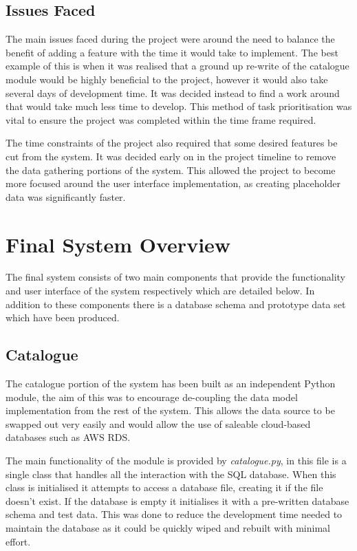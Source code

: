 \documentclass[12pt,titlepage]{article}
\begin{document}
  \subsection{Issues Faced}

  The main issues faced during the project were around the need to balance the
  benefit of adding a feature with the time it would take to implement. The best
  example of this is when it was realised that a ground up re-write of the
  catalogue module would be highly beneficial to the project, however it would
  also take several days of development time. It was decided instead to find a
  work around that would take much less time to develop. This method of task
  prioritisation was vital to ensure the project was completed within the
  time frame required.

  The time constraints of the project also required that some desired features
  be cut from the system. It was decided early on in the project timeline to
  remove the data gathering portions of the system. This allowed the project to
  become more focused around the user interface implementation, as creating
  placeholder data was significantly faster.

\section{Final System Overview}

  The final system consists of two main components that provide the
  functionality and user interface of the system respectively which are detailed
  below. In addition to these components there is a database schema and
  prototype data set which have been produced.

  \subsection{Catalogue}

  The catalogue portion of the system has been built as an independent Python
  module, the aim of this was to encourage de-coupling the data model
  implementation from the rest of the system. This allows the data source to be
  swapped out very easily and would allow the use of saleable cloud-based
  databases such as AWS RDS.

  The main functionality of the module is provided by \textit{catalogue.py}, in
  this file is a single class that handles all the interaction with the SQL
  database. When this class is initialised it attempts to access a database
  file, creating it if the file doesn't exist. If the database is empty it
  initialises it with a pre-written database schema and test data. This was done
  to reduce the development time needed to maintain the database as it could be
  quickly wiped and rebuilt with minimal effort.
\end{document}

